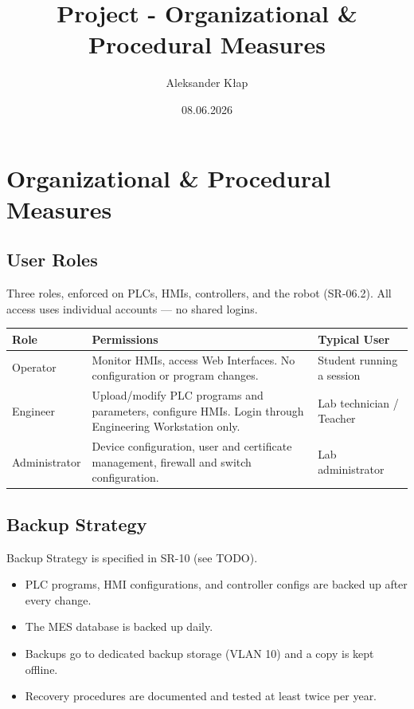 \documentclass{article}
\title{Project - Organizational \& Procedural Measures}
\author{Aleksander Kłap}
\date{08.06.2026}
\begin{document}
\maketitle
\pagebreak

\section{Organizational \& Procedural Measures}
\subsection{User Roles}
Three roles, enforced on PLCs, HMIs, controllers, and the robot (SR-06.2). All access uses individual accounts — no shared logins. \\

\renewcommand{\arraystretch}{1.3} %
\begin{tabularx}{\textwidth}{p{2.5cm} X X}
    \textbf{Role} & \textbf{Permissions} & \textbf{Typical User} \vspace{0.5em}\\
\toprule
    Operator & Monitor HMIs, access Web Interfaces. No configuration or program changes. & Student running a session \\
    \midrule
    Engineer & Upload/modify PLC programs and parameters, configure HMIs. Login through Engineering Workstation only. & Lab technician / Teacher \\
    \midrule
    Administrator &  Device configuration, user and certificate management, firewall and switch configuration. &  Lab administrator \\
    \bottomrule
\end{tabularx}
\vspace{1em}

\subsection{Backup Strategy}
Backup Strategy is specified in SR-10 (see TODO).

\begin{itemize}
    \item PLC programs, HMI configurations, and controller configs are backed up after every change.
    \item The MES database is backed up daily.
    \item Backups go to dedicated backup storage (VLAN 10) and a copy is kept offline.
    \item Recovery procedures are documented and tested at least twice per year.
\end{itemize}
\end{document}
